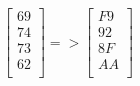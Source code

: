 \[
  \begin{bmatrix}
    69 \\
    74 \\
    73 \\
    62 \\
  \end{bmatrix}
  =>
  \begin{bmatrix}
    F9 \\
    92 \\
    8F \\
    AA \\
  \end{bmatrix}
\]